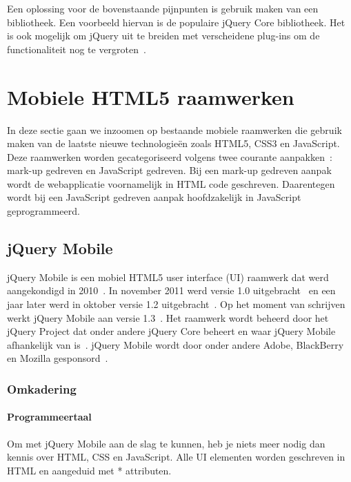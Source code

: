 Een oplossing voor de bovenstaande pijnpunten is gebruik maken van een bibliotheek. Een voorbeeld hiervan is de populaire jQuery Core bibliotheek. Het is ook mogelijk om jQuery  uit te breiden met verscheidene plug-ins om de functionaliteit nog te vergroten~\cite{McFarland2011}.


\section{Mobiele HTML5 raamwerken}
\label{sec:mobiele-html5-raamwerken}
In deze sectie gaan we inzoomen op bestaande mobiele raamwerken die gebruik maken van de laatste nieuwe technologieën zoals HTML5, CSS3 en JavaScript. Deze raamwerken worden gecategoriseerd volgens twee courante aanpakken~\cite{Oeflman2011}: mark-up gedreven en JavaScript gedreven. Bij een mark-up gedreven aanpak wordt de webapplicatie voornamelijk in HTML code geschreven. Daarentegen wordt bij een JavaScript gedreven aanpak hoofdzakelijk in JavaScript geprogrammeerd.

\subsection{jQuery Mobile}
jQuery Mobile is een mobiel HTML5 user interface (UI) raamwerk dat werd aangekondigd in 2010~\cite{Resig2010}. In november 2011 werd versie 1.0 uitgebracht~\cite{Parker2011} en een jaar later werd in oktober versie 1.2 uitgebracht~\cite{Parker2012}. Op het moment van schrijven werkt jQuery Mobile aan versie 1.3~\cite{Parker2012a}. Het raamwerk wordt beheerd door het jQuery Project dat onder andere jQuery Core beheert en waar jQuery Mobile afhankelijk van is~\cite{JQuery2012}. jQuery Mobile wordt door onder andere Adobe, BlackBerry en Mozilla gesponsord~\cite{JQuery2012a}.

\subsubsection{Omkadering}
\paragraph{Programmeertaal}
Om met jQuery Mobile aan de slag te kunnen, heb je niets meer nodig dan kennis over HTML, CSS en JavaScript. Alle UI elementen worden geschreven in HTML en aangeduid met * attributen.

